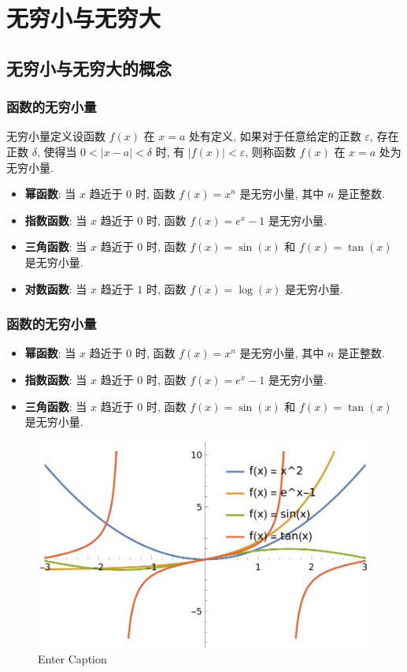 \documentclass[
10pt, 
aspectratio=43, 
]{beamer}
\begin{document}
\section{无穷小与无穷大}

\subsection{无穷小与无穷大的概念}

\begin{frame}
	\frametitle{函数的无穷小量}
	
	
	\begin{block}{无穷小量定义}设函数 $f(x)$ 在 $x=a$ 处有定义, 如果对于任意给定的正数 $\varepsilon$, 存在正数 $\delta$, 使得当 $0 < |x-a| < \delta$ 时, 有 $|f(x)| < \varepsilon$, 则称函数 $f(x)$ 在 $x=a$ 处为无穷小量. 
	\end{block}
	\begin{itemize}
		\item<2-> \textbf{幂函数}: 当 $x$ 趋近于 $0$ 时, 函数 $f(x) = x^n$ 是无穷小量, 其中 $n$ 是正整数. \\
		\item<3-> \textbf{指数函数}: 当 $x$ 趋近于 $0$ 时, 函数 $f(x) = e^x - 1$ 是无穷小量. \\
		\item<4-> \textbf{三角函数}: 当 $x$ 趋近于 $0$ 时, 函数 $f(x) = \sin(x)$ 和 $f(x) = \tan(x)$ 是无穷小量. \\
		\item<5-> \textbf{对数函数}: 当 $x$ 趋近于 $1$ 时, 函数 $f(x) = \log(x)$ 是无穷小量. 
	\end{itemize}
	
\end{frame}

\begin{frame}
	\frametitle{函数的无穷小量}
	
	\begin{itemize}
		\item<2-> \textbf{幂函数}: 当 $x$ 趋近于 $0$ 时, 函数 $f(x) = x^n$ 是无穷小量, 其中 $n$ 是正整数. \\
		\item<3-> \textbf{指数函数}: 当 $x$ 趋近于 $0$ 时, 函数 $f(x) = e^x - 1$ 是无穷小量. \\
		\item<4-> \textbf{三角函数}: 当 $x$ 趋近于 $0$ 时, 函数 $f(x) = \sin(x)$ 和 $f(x) = \tan(x)$ 是无穷小量. 
	\end{itemize}
	\begin{figure}
		\centering
		\includegraphics[width=0.5\linewidth]{small1.png}
		\caption{Enter Caption}
		\label{fig: enter-label}
	\end{figure}
\end{frame}
\end{document}
